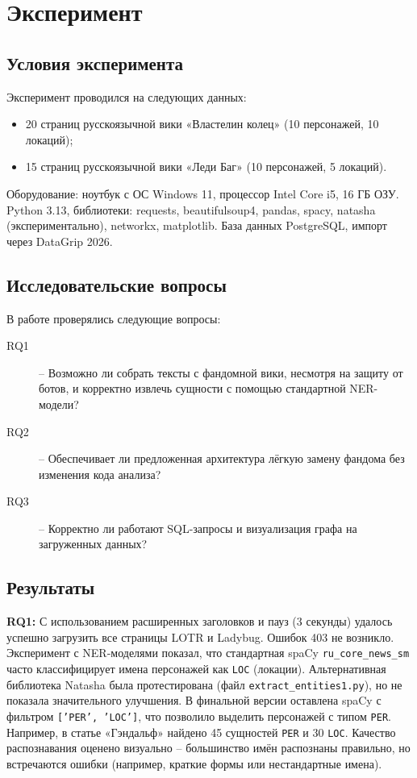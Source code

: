 \section{Эксперимент}

\subsection{Условия эксперимента}

Эксперимент проводился на следующих данных:
\begin{itemize}
    \item 20 страниц русскоязычной вики «Властелин колец» (10 персонажей, 10 локаций);
    \item 15 страниц русскоязычной вики «Леди Баг» (10 персонажей, 5 локаций).
\end{itemize}
Оборудование: ноутбук с ОС Windows 11, процессор Intel Core i5, 16 ГБ ОЗУ. Python 3.13, библиотеки: requests, beautifulsoup4, pandas, spacy, natasha (экспериментально), networkx, matplotlib. База данных PostgreSQL, импорт через DataGrip 2026.

\subsection{Исследовательские вопросы}

В работе проверялись следующие вопросы:
\begin{description}
    \item[RQ1] – Возможно ли собрать тексты с фандомной вики, несмотря на защиту от ботов, и корректно извлечь сущности с помощью стандартной NER-модели?
    \item[RQ2] – Обеспечивает ли предложенная архитектура лёгкую замену фандома без изменения кода анализа?
    \item[RQ3] – Корректно ли работают SQL-запросы и визуализация графа на загруженных данных?
\end{description}

\subsection{Результаты}

\textbf{RQ1:} С использованием расширенных заголовков и пауз (3 секунды) удалось успешно загрузить все страницы LOTR и Ladybug. Ошибок 403 не возникло. Эксперимент с NER-моделями показал, что стандартная spaCy \texttt{ru\_core\_news\_sm} часто классифицирует имена персонажей как \texttt{LOC} (локации). Альтернативная библиотека Natasha была протестирована (файл \texttt{extract\_entities1.py}), но не показала значительного улучшения. В финальной версии оставлена spaCy с фильтром \texttt{['PER', 'LOC']}, что позволило выделить персонажей с типом \texttt{PER}. Например, в статье «Гэндальф» найдено 45 сущностей \texttt{PER} и 30 \texttt{LOC}. Качество распознавания оценено визуально – большинство имён распознаны правильно, но встречаются ошибки (например, краткие формы или нестандартные имена).

